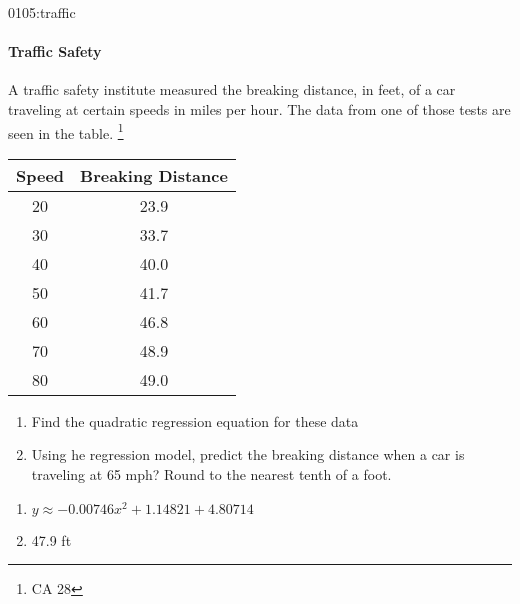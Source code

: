 \begin{defproblem}{0105:traffic}
\begin{onlyproblem}
\paragraph{Traffic Safety}
A traffic safety institute measured the breaking
distance, in feet, of a car traveling at certain speeds
in miles per hour.
The data from one of those tests are seen in the table.
\footnote{CA 28}
\begin{tabular}{c|c}
  \textbf{Speed} & \textbf{Breaking Distance} \\ \hline
  20 & 23.9 \\
  30 & 33.7\\
  40 & 40.0\\
  50 & 41.7\\
  60 & 46.8\\
  70 & 48.9\\
  80 & 49.0\\
\end{tabular}
\begin{enumerate}
\item Find the quadratic regression equation for these data
\item Using he regression model, predict the breaking distance
when a car is traveling at 65 mph?  Round to the nearest tenth
of a foot.
\end{enumerate}
\end{onlyproblem}
\begin{onlysolution}
\begin{enumerate}
\item $y\approx-0.00746x^2+1.14821+4.80714$
\item 47.9 ft
\end{enumerate}
\end{onlysolution}
\end{defproblem}




